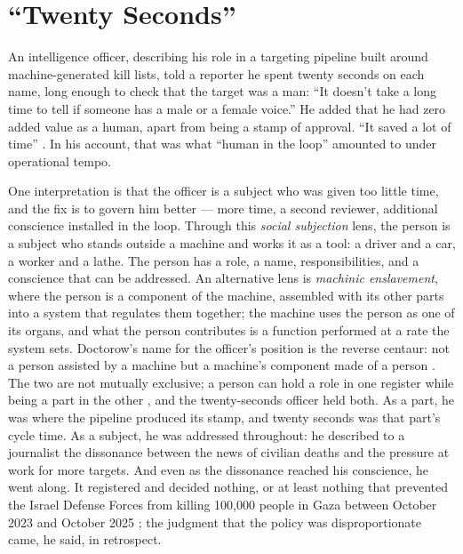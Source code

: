 \chapter{“Twenty Seconds”}
\label{sec:1}
An intelligence officer, describing his role in a targeting pipeline built around machine-generated kill lists, told a reporter he spent twenty seconds on each name, long enough to check that the target was a man: “It doesn't take a long time to tell if someone has a male or a female voice.” He added that he had zero added value as a human, apart from being a stamp of approval. “It saved a lot of time” \autocite{abraham2024lavender}. In his account, that was what “human in the loop” amounted to under operational tempo.

One interpretation is that the officer is a subject who was given too little time, and the fix is to govern him better — more time, a second reviewer, additional conscience installed in the loop. Through this \emph{social subjection} lens, the person is a subject who stands outside a machine and works it as a tool: a driver and a car, a worker and a lathe. The person has a role, a name, responsibilities, and a conscience that can be addressed. An alternative lens is \emph{machinic enslavement}, where the person is a component of the machine, assembled with its other parts into a system that regulates them together; the machine uses the person as one of its organs, and what the person contributes is a function performed at a rate the system sets. Doctorow's name for the officer's position is the reverse centaur: not a person assisted by a machine but a machine's component made of a person \autocite{doctorow2026reversecentaur}. The two are not mutually exclusive; a person can hold a role in one register while being a part in the other \autocite[Plateau 13, “The Apparatus of Capture”: there is enslavement when human beings are themselves constituent pieces of a machine they compose among themselves and with other things, under the control and direction of a higher unity, and subjection when the higher unity constitutes the human being as a subject linked to a new exterior object, which can be an animal, a tool, or even a machine]{deleuze1987plateaus}, and the twenty-seconds officer held both. As a part, he was where the pipeline produced its stamp, and twenty seconds was that part's cycle time. As a subject, he was addressed throughout: he described to a journalist the dissonance between the news of civilian deaths and the pressure at work for more targets. And even as the dissonance reached his conscience, he went along. It registered and decided nothing, or at least nothing that prevented the Israel Defense Forces from killing 100,000 people in Gaza between October 2023 and October 2025 \autocite{gomezugarte2025uncertainty,acosta2026gaza,economist2025gaza}; the judgment that the policy was disproportionate came, he said, in retrospect.

